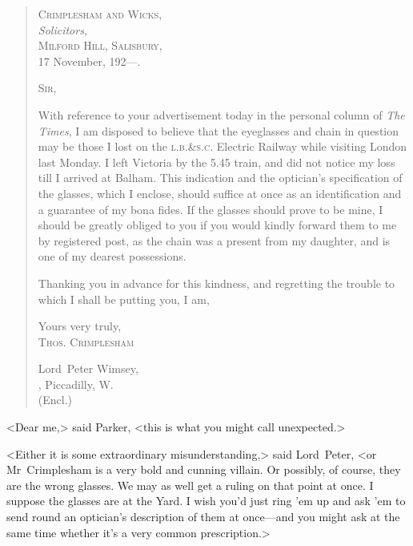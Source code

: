 \begin{quotation}
\begin{flushright}
\hfill
\begin{minipage}{0.5\linewidth}
\textsc{Crimplesham and Wicks,}\\
\vin \textit{Solicitors,}\\
\textsc{Milford Hill, Salisbury,}\\
17 November, 192—.
\end{minipage}
\end{flushright}

\noindent \textsc{Sir,}

With reference to your advertisement today in the personal column of \textit{The Times}, I am disposed to believe that the eyeglasses and chain in question may be those I lost on the \textsc{l.b.\&s.c.} Electric Railway while visiting London last Monday. I left Victoria by the 5.45 train, and did not notice my loss till I arrived at Balham. This indication and the optician's specification of the glasses, which I enclose, should suffice at once as an identification and a guarantee of my bona fides. If the glasses should prove to be mine, I should be greatly obliged to you if you would kindly forward them to me by registered post, as the chain was a present from my daughter, and is one of my dearest possessions.

Thanking you in advance for this kindness, and regretting the trouble to which I shall be putting you, I am,

\begin{flushright}
Yours very truly,\\
\textsc{Thos. Crimplesham}\\
\end{flushright}

\noindent Lord~Peter Wimsey,\\
, Piccadilly, W\@.\\
\noindent (Encl.)
\end{quotation}

<Dear me,> said Parker, <this is what you might call unexpected.>

<Either it is some extraordinary misunderstanding,> said Lord~Peter, <or Mr~Crimplesham is a very bold and cunning villain. Or possibly, of course, they are the wrong glasses. We may as well get a ruling on that point at once. I suppose the glasses are at the Yard. I wish you'd just ring 'em up and ask 'em to send round an optician's description of them at once—and you might ask at the same time whether it's a very common prescription.>

